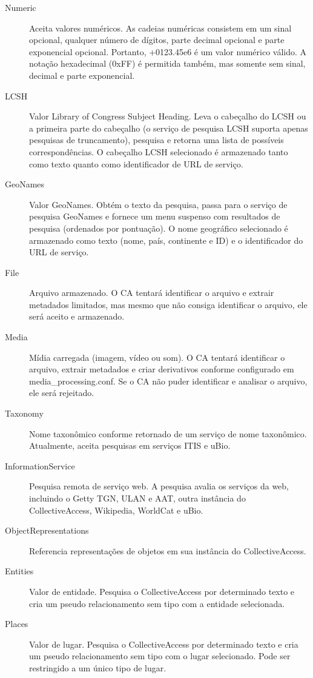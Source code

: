 \begin{description}
	\item [Numeric] Aceita valores numéricos. As cadeias numéricas consistem em um sinal opcional, qualquer número de dígitos, parte decimal opcional e parte exponencial opcional. Portanto, +0123.45e6 é um valor numérico válido. A notação hexadecimal (0xFF) é permitida também, mas somente sem sinal, decimal e parte exponencial.
	\item [LCSH] Valor Library of Congress Subject Heading. Leva o cabeçalho do LCSH ou a primeira parte do cabeçalho (o serviço de pesquisa LCSH suporta apenas pesquisas de truncamento), pesquisa e retorna uma lista de possíveis correspondências. O cabeçalho LCSH selecionado é armazenado tanto como texto quanto como identificador de URL de serviço.
	\item [GeoNames] Valor GeoNames. Obtém o texto da pesquisa, passa para o serviço de pesquisa GeoNames e fornece um menu suspenso com resultados de pesquisa (ordenados por pontuação). O nome geográfico selecionado é armazenado como texto (nome, país, continente e ID) e o identificador do URL de serviço.
	\item [File] Arquivo armazenado. O CA tentará identificar o arquivo e extrair metadados limitados, mas mesmo que não consiga identificar o arquivo, ele será aceito e armazenado.
	\item [Media] Mídia carregada (imagem, vídeo ou som). O CA tentará identificar o arquivo, extrair metadados e criar derivativos conforme configurado em media\_processing.conf. Se o CA não puder identificar e analisar o arquivo, ele será rejeitado.
	\item [Taxonomy] Nome taxonômico conforme retornado de um serviço de nome taxonômico. Atualmente, aceita pesquisas em serviços ITIS e uBio.
	\item [InformationService] Pesquisa remota de serviço web. A pesquisa avalia os serviços da web, incluindo o Getty TGN, ULAN e AAT, outra instância do CollectiveAccess, Wikipedia, WorldCat e uBio.
	\item [ObjectRepresentations] Referencia representações de objetos em sua instância do CollectiveAccess.
	\item [Entities] Valor de entidade. Pesquisa o CollectiveAccess por determinado texto e cria um pseudo relacionamento sem tipo com a entidade selecionada.
	\item [Places] Valor de lugar. Pesquisa o CollectiveAccess por determinado texto e cria um pseudo relacionamento sem tipo com o lugar selecionado. Pode ser restringido a um único tipo de lugar.

\end{description}
